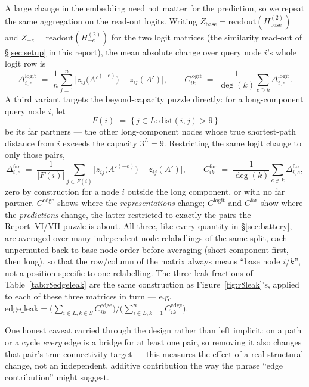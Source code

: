 \documentclass[11pt,a4paper]{article}
\begin{document}
A large change in the embedding need not matter for the prediction, so we
repeat the same aggregation on the read-out logits. Writing
$Z_{\mathrm{base}}=\mathrm{readout}(H^{(2)}_{\mathrm{base}})$ and
$Z_{-e}=\mathrm{readout}(H^{(2)}_{-e})$ for the two logit matrices (the
similarity read-out of \S\ref{sec:setup} in this report), the mean absolute
change over query node $i$'s whole logit row is
\[ \Delta^{\mathrm{logit}}_{i,e} \;=\; \frac{1}{n}\sum_{j=1}^{n}
   \big| z_{ij}\big(A'^{(-e)}\big) - z_{ij}(A') \big|, \qquad
   C^{\mathrm{logit}}_{ik} \;=\; \frac{1}{\deg(k)}\sum_{e\ni k}\Delta^{\mathrm{logit}}_{i,e}. \]
A third variant targets the beyond-capacity puzzle directly: for a
long-component query node $i$, let
\[ F(i) \;=\; \{\, j\in L : \mathrm{dist}(i,j) > 9 \,\} \]
be its far partners --- the other long-component nodes whose true shortest-path
distance from $i$ exceeds the capacity $3^L=9$. Restricting the same logit
change to only those pairs,
\[ \Delta^{\mathrm{far}}_{i,e} \;=\; \frac{1}{|F(i)|}\sum_{j\in F(i)}
   \big| z_{ij}\big(A'^{(-e)}\big) - z_{ij}(A') \big|, \qquad
   C^{\mathrm{far}}_{ik} \;=\; \frac{1}{\deg(k)}\sum_{e\ni k}\Delta^{\mathrm{far}}_{i,e}, \]
zero by construction for a node $i$ outside the long component, or with no
far partner. $C^{\mathrm{edge}}$ shows where the \emph{representations}
change; $C^{\mathrm{logit}}$ and $C^{\mathrm{far}}$ show where the
\emph{predictions} change, the latter restricted to exactly the pairs the
Report~VI/VII puzzle is about. All three, like every quantity in
\S\ref{sec:battery}, are averaged over many independent node-relabellings of
the same split, each unpermuted back to base node order before averaging
(short component first, then long), so that the row/column of the matrix
always means ``base node $i$/$k$'', not a position specific to one
relabelling. The three leak fractions of Table~\ref{tab:r8edgeleak} are the
same construction as Figure~\ref{fig:r8leak}'s, applied to each of these
three matrices in turn --- e.g.\
$\mathrm{edge\_leak} = \big(\sum_{i\in L,k\in S}C^{\mathrm{edge}}_{ik}\big)
\big/ \big(\sum_{i\in L,k=1}^{n}C^{\mathrm{edge}}_{ik}\big)$.

One honest caveat carried through the design rather than left implicit: on a path or a
cycle \emph{every} edge is a bridge for at least one pair, so removing it
also changes that pair's true connectivity target --- this measures the
effect of a real structural change, not an independent, additive
contribution the way the phrase ``edge contribution'' might suggest.
\end{document}
